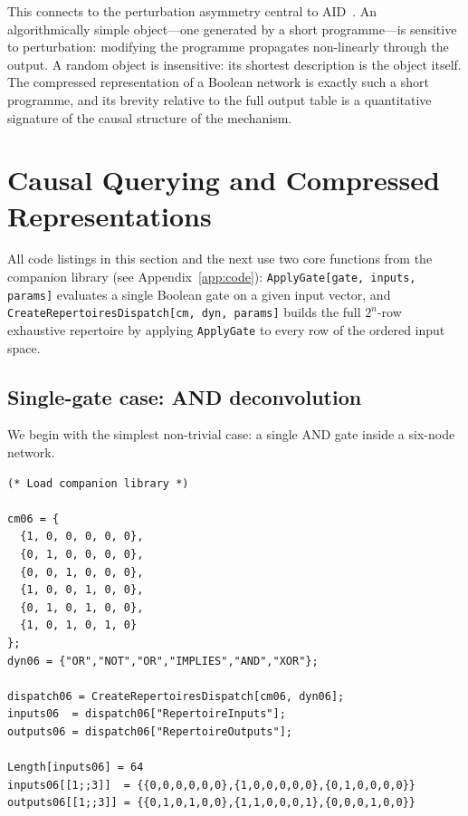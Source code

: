 \documentclass[11pt]{article}
\begin{document}
This connects to the perturbation asymmetry central to
AID~\cite{zenilcalculus}.  An algorithmically simple object---one
generated by a short programme---is sensitive to perturbation: modifying
the programme propagates non-linearly through the output.  A random
object is insensitive: its shortest description is the object itself.
The compressed representation of a Boolean network is exactly such a
short programme, and its brevity relative to the full output table is a
quantitative signature of the causal structure of the mechanism.


\section{Causal Querying and Compressed Representations}\label{sec:querying}

All code listings in this section and the next use two core functions from
the companion library (see Appendix~\ref{app:code}):
\texttt{ApplyGate[gate, inputs, params]} evaluates a single Boolean gate
on a given input vector, and
\texttt{CreateRepertoiresDispatch[cm, dyn, params]} builds the full
$2^n$-row exhaustive repertoire by applying \texttt{ApplyGate} to every
row of the ordered input space.

\subsection{Single-gate case: AND deconvolution}\label{sec:and-deconv}

We begin with the simplest non-trivial case: a single AND gate inside a
six-node network.

\begin{lstlisting}[style=MathematicaStyle,caption={Six-node network definition and exhaustive repertoire via gate dispatch.},label={6-nodes-list-code}]
(* Load companion library *)

cm06 = {
  {1, 0, 0, 0, 0, 0},
  {0, 1, 0, 0, 0, 0},
  {0, 0, 1, 0, 0, 0},
  {1, 0, 0, 1, 0, 0},
  {0, 1, 0, 1, 0, 0},
  {1, 0, 1, 0, 1, 0}
};
dyn06 = {"OR","NOT","OR","IMPLIES","AND","XOR"};

dispatch06 = CreateRepertoiresDispatch[cm06, dyn06];
inputs06  = dispatch06["RepertoireInputs"];
outputs06 = dispatch06["RepertoireOutputs"];

Length[inputs06] = 64
inputs06[[1;;3]]  = {{0,0,0,0,0,0},{1,0,0,0,0,0},{0,1,0,0,0,0}}
outputs06[[1;;3]] = {{0,1,0,1,0,0},{1,1,0,0,0,1},{0,0,0,1,0,0}}
\end{lstlisting}
\end{document}
